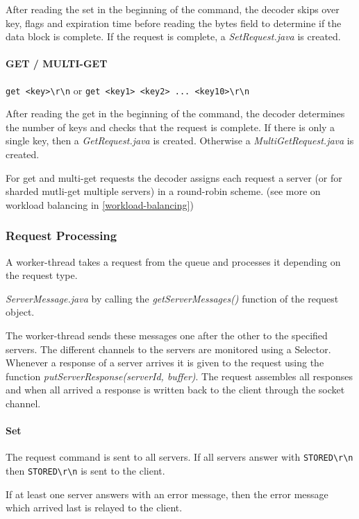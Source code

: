 \documentclass[11pt,a4paper]{article}
\begin{document}
After reading the set in the beginning of the command, the decoder skips over key, flags and expiration time before reading the bytes field to determine if the data block is complete. If the request is complete, a \emph{SetRequest.java} is created.

\paragraph{GET / MULTI-GET} \texttt{get <key>\textbackslash r\textbackslash n} or \texttt{get <key1> <key2> ... <key10>\textbackslash r\textbackslash n}

After reading the get in the beginning of the command, the decoder determines the number of keys and checks that the request is complete. If there is only a single key, then a \emph{GetRequest.java} is created. Otherwise a \emph{MultiGetRequest.java} is created.

For get and multi-get requests the decoder assigns each request a server (or for sharded mutli-get multiple servers) in a round-robin scheme. (see more on workload balancing in \ref{workload-balancing})


\subsubsection{Request Processing}\label{request-processing}

A worker-thread takes a request from the queue and processes it depending on the request type.

\emph{ServerMessage.java} by calling the \emph{getServerMessages()} function of the request object.

The worker-thread sends these messages one after the other to the specified servers.
The different channels to the servers are monitored using a Selector. Whenever a response of a server arrives it 
is given to the request using the function \emph{putServerResponse(serverId, buffer)}. The request assembles all responses and when all arrived a response is written back to the client through the socket channel.

\paragraph{Set} The request command is sent to all servers. If all servers answer with \texttt{STORED\textbackslash r\textbackslash n} then \texttt{STORED\textbackslash r\textbackslash n} is sent to the client. 

If at least one server answers with an error message, then the error message which arrived last is relayed to the client.
\end{document}
